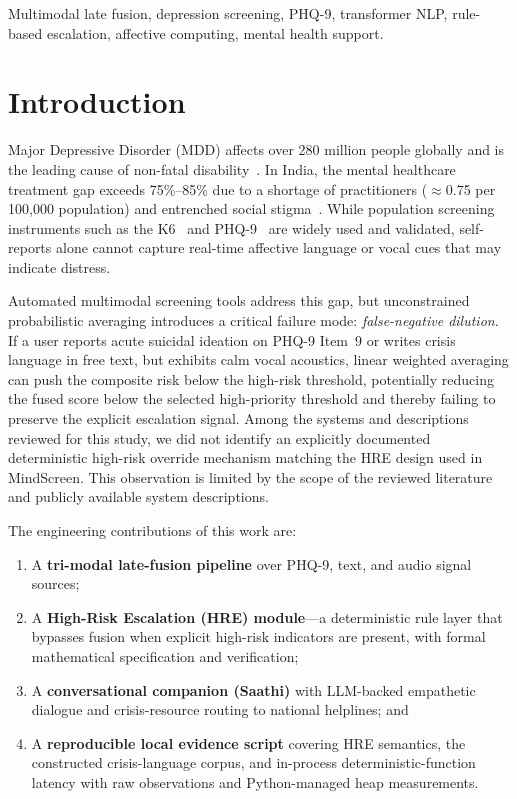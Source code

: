 \documentclass[10pt, conference, letterpaper]{IEEEtran}
\begin{document}
\begin{IEEEkeywords}
Multimodal late fusion, depression screening, PHQ-9, transformer NLP,
rule-based escalation, affective computing, mental health support.
\end{IEEEkeywords}

\section{Introduction}
\label{sec:intro}

Major Depressive Disorder (MDD) affects over 280 million people globally and
is the leading cause of non-fatal disability~\cite{who2023}.
In India, the mental healthcare treatment gap exceeds 75\%--85\% due to a
shortage of practitioners ($\approx$0.75 per 100{,}000 population) and
entrenched social stigma~\cite{gururaj2016}.
While population screening instruments such as the K6~\cite{kessler2003} and
PHQ-9~\cite{kroenke2001} are widely used and validated, self-reports alone
cannot capture real-time affective language or vocal cues that may indicate distress.

Automated multimodal screening tools address this gap, but unconstrained
probabilistic averaging introduces a critical failure mode:
\textit{false-negative dilution}.
If a user reports acute suicidal ideation on PHQ-9 Item~9 or writes crisis
language in free text, but exhibits calm vocal acoustics, linear weighted
averaging can push the composite risk below the high-risk threshold,
potentially reducing the fused score below the selected high-priority
threshold and thereby failing to preserve the explicit escalation signal.
Among the systems and descriptions reviewed for this study, we did not identify
an explicitly documented deterministic high-risk override mechanism matching
the HRE design used in MindScreen. This observation is limited by the scope of
the reviewed literature and publicly available system descriptions.

The engineering contributions of this work are:
\begin{enumerate}
  \item A \textbf{tri-modal late-fusion pipeline} over PHQ-9, text, and
    audio signal sources;
  \item A \textbf{High-Risk Escalation (HRE) module}---a deterministic
    rule layer that bypasses fusion when explicit high-risk indicators are
    present, with formal mathematical specification and verification;
  \item A \textbf{conversational companion (Saathi)} with LLM-backed
    empathetic dialogue and crisis-resource routing to national helplines; and
  \item A \textbf{reproducible local evidence script} covering HRE semantics,
    the constructed crisis-language corpus, and in-process deterministic-function
    latency with raw observations and Python-managed heap measurements.
\end{enumerate}
\end{document}
